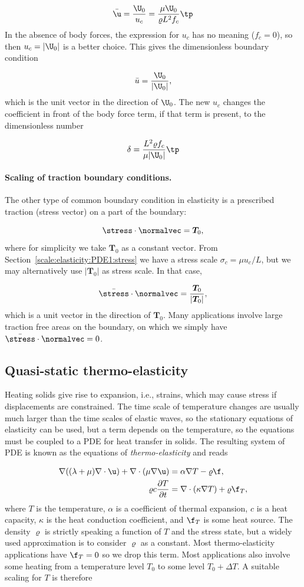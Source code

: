 \documentclass[graybox,envcountchap,sectrefs,final]{svmonodo}
\begin{document}
\[ \bar\u = \frac{\U_0}{u_c} = \frac{\mu \U_0}{\varrho L^2f_c}\tp\]
In the absence of body forces, the expression for $u_c$ has no
meaning ($f_c=0$), so then $u_c = |\U_0|$ is a better choice.
This gives the dimensionless boundary condition

\[ \bar u = \frac{\U_0}{|\U_0|},\]
which is the unit vector in the direction of $\U_0$. The new $u_c$
changes the coefficient in front of the body force term, if that term
is present, to the dimensionless number

\[ \delta = \frac{L^2\varrho f_c}{\mu |\U_0|}\tp\]

\paragraph{Scaling of traction boundary conditions.}
The other type of common boundary condition in elasticity is a
prescribed traction (stress vector) on a part of the boundary:

\[ \stress\cdot\normalvec = \bm{T}_0,\]
where for simplicity we take $\bm{T}_0$ as a constant vector.
From Section~\ref{scale:elasticity:PDE1:stress} we have a stress scale
$\sigma_c = \mu u_c/L$, but we may alternatively use $|\bm{T}_0|$
as stress scale. In that case,

\[ \bar\stress\cdot\normalvec = \frac{\bm{T}_0}{|\bm{T}_0|},\]
which is a unit vector in the direction of $\bm{T}_0$.
Many applications involve large traction free areas on the boundary, on
which we simply have $\bar\stress\cdot\normalvec = 0$.


\subsection{Quasi-static thermo-elasticity}
\label{scale:elasticity:thermo}


Heating solids give rise to expansion, i.e., strains, which may cause
stress if displacements are constrained. The time scale of temperature
changes are usually much larger than the time scales of elastic waves,
so the stationary equations of elasticity can be used, but a term
depends on the temperature, so the equations must be coupled to
a PDE for heat transfer in solids. The resulting system of PDE is
known as the equations of \emph{thermo-elasticity} and reads

\begin{align}
\nabla((\lambda + \mu)\nabla\cdot\u) + \nabla\cdot(\mu\nabla\u) &= \alpha\nabla T -\varrho\f,\\ 
\varrho c \frac{\partial T}{\partial t} &= \nabla\cdot(\kappa\nabla T) + \varrho \f_T,
\end{align}
where $T$ is the temperature, $\alpha$ is a coefficient of thermal expansion,
$c$ is a heat capacity, $\kappa$ is the heat conduction coefficient,
and $\f_T$ is some heat source. The density $\varrho$ is strictly speaking
a function of $T$ and the stress state, but a widely used approximation
is to consider $\varrho$ as a constant.
Most thermo-elasticity applications have
$\f_T=0$ so we drop this term. Most applications also involve some heating
from a temperature level $T_0$ to some level $T_0 +\Delta T$.
A suitable scaling for $T$ is therefore
\end{document}
